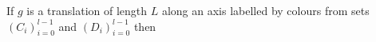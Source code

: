 \documentclass[preview]{standalone}
\begin{document}
\begin{center}
If $g$ is a translation of length $L$ along an axis labelled by colours from sets $(C_i)_{i=0}^{l-1}$ and $(D_i)_{i=0}^{l-1}$ then
\end{center}
\end{document}
